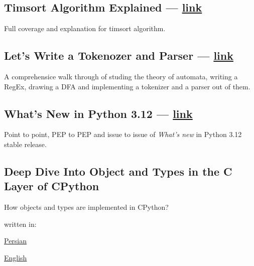 \begin{multicols}{2}
\subsection{{Timsort Algorithm Explained --- \href{https://virgool.io/@liewpl/timsort-algorithm-explained-u41h0wv0jnax}{link}}}
\begin{zitemize}
\item Full coverage and explanation for {\ttfamily timsort} algorithm.
\end{zitemize}

\subsection{{Let's Write a Tokenozer and Parser --- \href{https://virgool.io/@liewpl/tokenizer-parser-in-python-ubzlsvukmdxz}{link}}}
\begin{zitemize}
\item A comprehensice walk through of studing the theory of automata, writing a RegEx, drawing a DFA and implementing a tokenizer and a parser out of them.
\end{zitemize}

\subsection{{What's New in Python 3.12 --- \href{https://virgool.io/@liewpl/python-3-12-whats-new-vpq99njtytc6}{link}}}
\begin{zitemize}
\item Point to point, PEP to PEP and issue to issue of \textit{What's new} in Python 3.12 stable release.
\end{zitemize}

\subsection{{Deep Dive Into Object and Types in the C Layer of CPython}}
\begin{zitemize}
\item How objects and types are implemented in CPython?
\item written in:
\begin{zitemize}
\item \href{https://virgool.io/@liewpl/cpython-objs-types-c-layer-deep-dive-m5fjelhzrzny}{Persian}
\item \href{https://virgool.io/@liewpl/cpython-objs-types-c-layer-deep-dive-m5fjelhzrzny}{English}
\end{zitemize}
\end{zitemize}


\end{multicols}

